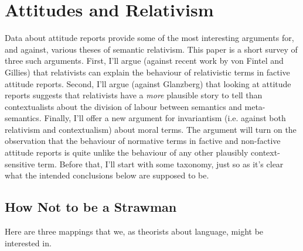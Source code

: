 










\chapter{Attitudes and Relativism}

\noindent Data about attitude reports provide some of the most interesting arguments for, and against, various theses of semantic relativism. This paper is a short survey of three such arguments. First, I'll argue (against recent work by von Fintel and Gillies) that relativists can explain the behaviour of relativistic terms in factive attitude reports. Second, I'll argue (against Glanzberg) that looking at attitude reports suggests that relativists have a \textit{more} plausible story to tell than contextualists about the division of labour between semantics and meta-semantics. Finally, I'll offer a new argument for invariantism (i.e. against both relativism and contextualism) about moral terms. The argument will turn on the observation that the behaviour of normative terms in factive and non-factive attitude reports is quite unlike the behaviour of any other plausibly context-sensitive term. Before that, I'll start with some taxonomy, just so as it's clear what the intended conclusions below are supposed to be.


\section{How Not to be a Strawman}

Here are three mappings that we, as theorists about language, might be interested in.

